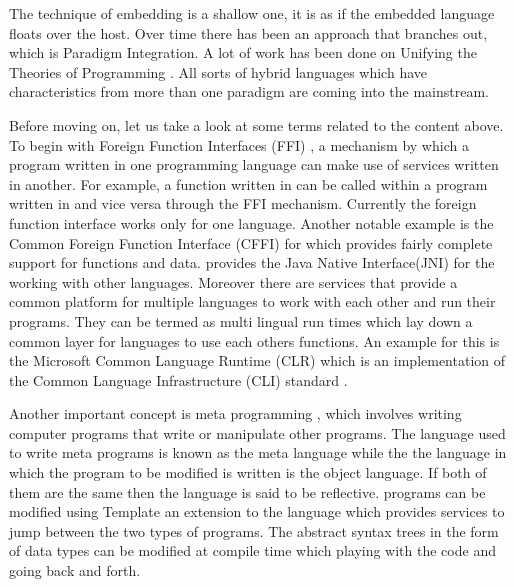 \documentclass[thesis-solanki.tex]{subfiles}
\begin{document}
\par The technique of embedding is a shallow one, it is as if the embedded language floats over the host. Over time 
there has been an approach that branches out, which is Paradigm Integration. A lot of work has been done on 
Unifying the Theories of Programming 
\cite{DBLP:conf/utp/2006,DBLP:conf/utp/2008,DBLP:conf/utp/2010,DBLP:conf/utp/2012,hoare1998unifying,
gibbons2013unifying}. All sorts of hybrid languages which have characteristics from more than one paradigm are 
coming into the mainstream.

\par Before moving on, let us take a look at some terms related to the content above. To begin with Foreign 
Function Interfaces (FFI) \cite{website:ffiwiki}, a mechanism by which a program written in one programming 
language can make use of services written in another. For example, a function written in  can be 
called within a program written in  and vice versa through the FFI mechanism. Currently the 
 foreign function interface works only for one language. Another notable example is the 
Common Foreign Function Interface (CFFI) \cite{website:commonlisp} for  which provides fairly 
complete support for  functions and data.  provides the Java Native Interface(JNI) for 
the working with other languages. Moreover there are services that provide a common platform for multiple 
languages to work with each other and run their programs. They can be termed as multi lingual run times which lay 
down a common layer for languages to use each others functions. An example for this is the Microsoft Common 
Language Runtime (CLR) \cite{website:clrwiki} which is an implementation of the Common Language 
Infrastructure (CLI) standard \cite{website:cliwiki}.        

\par Another important concept is meta programming \cite{website:metaprogwiki}, which involves writing computer programs that write or manipulate 
other programs. The language used to write meta programs is known as the meta language while the the language in which the program to be modified is 
written is the object language. If both of them are the same then the language is said to be reflective.  programs can be modified using 
Template  \cite{website:templatehaskell} an extension to the language which provides services to jump between the two types of 
programs. The abstract syntax trees in the form of  data types can be modified at compile time which playing with the code and going 
back and forth.      
\end{document}
